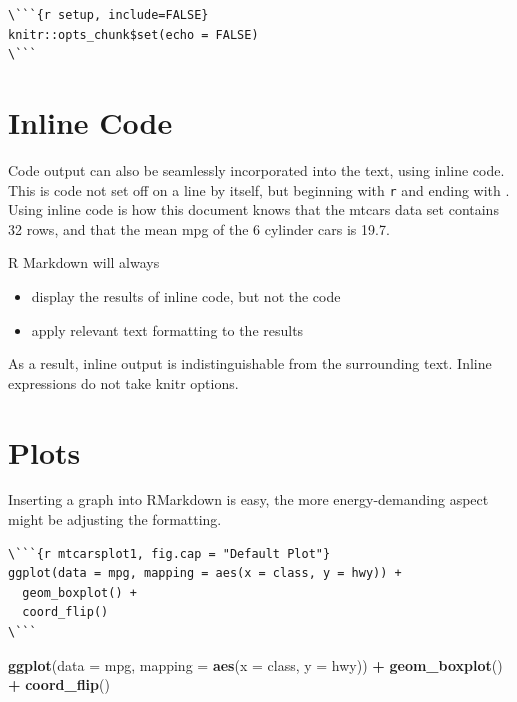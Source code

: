 \documentclass[]{book}
\newenvironment{Shaded}{\begin{snugshade}}{\end{snugshade}}
\newcommand{\KeywordTok}[1]{\textcolor[rgb]{0.13,0.29,0.53}{\textbf{#1}}}
\newcommand{\DataTypeTok}[1]{\textcolor[rgb]{0.13,0.29,0.53}{#1}}
\newcommand{\StringTok}[1]{\textcolor[rgb]{0.31,0.60,0.02}{#1}}
\newcommand{\OperatorTok}[1]{\textcolor[rgb]{0.81,0.36,0.00}{\textbf{#1}}}
\newcommand{\NormalTok}[1]{#1}
\providecommand{\tightlist}{%
  \setlength{\itemsep}{0pt}\setlength{\parskip}{0pt}}
\begin{document}
\begin{verbatim}
\```{r setup, include=FALSE} 
knitr::opts_chunk$set(echo = FALSE)
\```
\end{verbatim}

\section{Inline Code}\label{inline-code}

Code output can also be seamlessly incorporated into the text, using
inline code. This is code not set off on a line by itself, but beginning
with \texttt{\textasciigrave{}r} and ending with
\texttt{\textasciigrave{}}. Using inline code is how this document knows
that the mtcars data set contains 32 rows, and that the mean mpg of the
6 cylinder cars is 19.7.

R Markdown will always

\begin{itemize}
\tightlist
\item
  display the results of inline code, but not the code
\item
  apply relevant text formatting to the results
\end{itemize}

As a result, inline output is indistinguishable from the surrounding
text. Inline expressions do not take knitr options.

\section{Plots}\label{plots}

Inserting a graph into RMarkdown is easy, the more energy-demanding
aspect might be adjusting the formatting.

\begin{verbatim}
\```{r mtcarsplot1, fig.cap = "Default Plot"}
ggplot(data = mpg, mapping = aes(x = class, y = hwy)) + 
  geom_boxplot() +
  coord_flip()
\```
\end{verbatim}

\begin{Shaded}
\begin{Highlighting}[]
\KeywordTok{ggplot}\NormalTok{(}\DataTypeTok{data =}\NormalTok{ mpg, }\DataTypeTok{mapping =} \KeywordTok{aes}\NormalTok{(}\DataTypeTok{x =}\NormalTok{ class, }\DataTypeTok{y =}\NormalTok{ hwy)) }\OperatorTok{+}\StringTok{ }
\StringTok{  }\KeywordTok{geom_boxplot}\NormalTok{() }\OperatorTok{+}
\StringTok{  }\KeywordTok{coord_flip}\NormalTok{()}
\end{Highlighting}
\end{Shaded}
\end{document}
